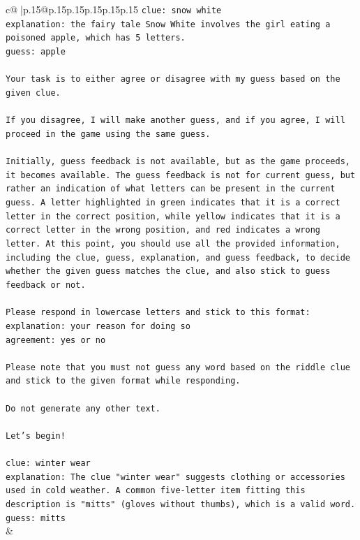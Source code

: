 \documentclass{article}
\begin{document}
{\begin{supertabular}{c@{$\;$}|p{.15\linewidth}@{}p{.15\linewidth}p{.15\linewidth}p{.15\linewidth}p{.15\linewidth}p{.15\linewidth}}
{{{\texttt{clue: snow white} \\
\texttt{explanation: the fairy tale Snow White involves the girl eating a poisoned apple, which has 5 letters.} \\
\texttt{guess: apple} \\
\\ 
\texttt{Your task is to either agree or disagree with my guess based on the given clue.} \\
\\ 
\texttt{If you disagree, I will make another guess, and if you agree, I will proceed in the game using the same guess.} \\
\\ 
\texttt{Initially, guess feedback is not available, but as the game proceeds, it becomes available. The guess feedback is not for current guess, but rather an indication of what letters can be present in the current guess. A letter highlighted in green indicates that it is a correct letter in the correct position, while yellow indicates that it is a correct letter in the wrong position, and red indicates a wrong letter. At this point, you should use all the provided information, including the clue, guess, explanation, and guess feedback, to decide whether the given guess matches the clue, and also stick to guess feedback or not.} \\
\\ 
\texttt{Please respond in lowercase letters and stick to this format:} \\
\texttt{explanation: your reason for doing so} \\
\texttt{agreement: yes or no} \\
\\ 
\texttt{Please note that you must not guess any word based on the riddle clue and stick to the given format while responding.} \\
\\ 
\texttt{Do not generate any other text.} \\
\\ 
\texttt{Let's begin!} \\
\\ 
\texttt{clue: winter wear} \\
\texttt{explanation: The clue "winter wear" suggests clothing or accessories used in cold weather. A common five{-}letter item fitting this description is "mitts" (gloves without thumbs), which is a valid word.} \\
\texttt{guess: mitts} \\
            }
        }
    }
    & \\ \\


\end{supertabular}}
\end{document}
